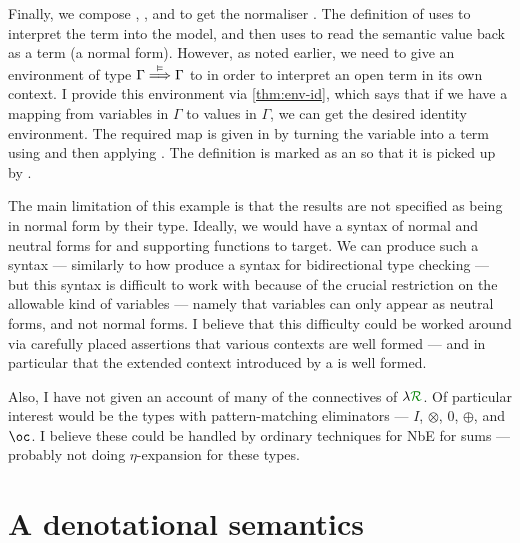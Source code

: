 
Finally, we compose , , and
 to get the normaliser .
The definition of  uses  to interpret the
term into the model, and then uses  to read the semantic
value back as a term (a normal form).
However, as noted earlier, we need to give an environment of type
$\Gamma \stackrel{\vDash}\Longrightarrow \Gamma$ to  in order to interpret an open
term in its own context.
I provide this environment via \cref{thm:env-id}, which says that if we have a
mapping from variables in $\Gamma$ to values in $\Gamma$, we can get the desired
identity environment.
The required map is given in
by turning the variable into a term using  and
then applying .
The definition  is marked as
an  so that it is picked up by
.


The main limitation of this example is that the results are not specified as
being in normal form by their type.
Ideally, we would have a syntax of normal and neutral forms for
 and supporting functions to target.
We can produce such a syntax --- similarly to how \citet{AACMM21} produce a
syntax for bidirectional type checking --- but this syntax is difficult to work
with because of the crucial restriction on the allowable kind of variables ---
namely that variables can only appear as neutral forms, and not normal forms.
I believe that this difficulty could be worked around via carefully placed
assertions that various contexts are well formed --- and in particular that the
extended context introduced by a  is well formed.

Also, I have not given an account of many of the connectives of $\name$.
Of particular interest would be the types with pattern-matching eliminators ---
$I$, $\otimes$, $0$, $\oplus$, and $\oc$.
I believe these could be handled by ordinary techniques for NbE for sums ---
probably not doing $\eta$-expansion for these types.


\section{A denotational semantics}\label{sec:den-sem}

